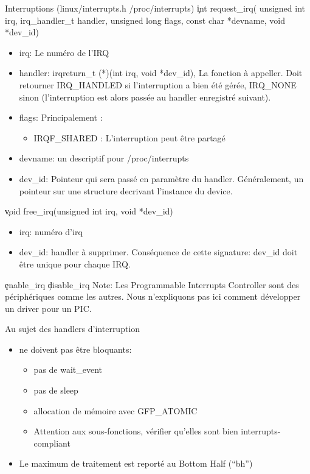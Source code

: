 \begin{frame}{Interruptions}
  (linux/interrupts.h /proc/interrupts)
  \c{int request_irq( unsigned int irq, irq_handler_t handler, unsigned long flags, const char *devname, void *dev_id)}
  \begin{itemize} 
  \item irq: Le numéro de l'IRQ
  \item handler: irqreturn_t (*)(int irq, void *dev_id), La fonction à appeller. Doit retourner IRQ_HANDLED si l'interruption a bien été gérée, IRQ_NONE sinon (l'interruption est alors passée au handler enregistré suivant).
  \item flags: Principalement : 
    \begin{itemize} 
    \item IRQF_SHARED : L'interruption peut être partagé
    \end{itemize} 
  \item devname: un descriptif pour /proc/interrupts
  \item dev_id: Pointeur qui sera passé en paramètre du handler. Généralement, un pointeur sur une structure decrivant l'instance du device.
  \end{itemize} 
  \c{void free_irq(unsigned int irq, void *dev_id)}
  \begin{itemize} 
  \item irq: numéro d'irq
  \item dev_id: handler à supprimer. Conséquence de cette signature: dev_id doit être unique pour chaque IRQ.
  \end{itemize} 
  \c{enable_irq}
  \c{disable_irq}
Note: Les Programmable Interrupts Controller sont des périphériques comme les autres. Nous n'expliquons pas ici comment développer un driver pour un PIC.
\end{frame}


\begin{frame}{Au sujet des handlers d'interruption}
  \begin{itemize} 
  \item ne doivent pas être bloquants: 
    \begin{itemize} 
    \item pas de wait_event
    \item pas de sleep
    \item allocation de mémoire avec GFP_ATOMIC 
    \item Attention aux sous-fonctions, vérifier qu'elles sont bien interrupts-compliant
    \end{itemize}
  \item Le maximum de traitement est reporté au Bottom Half (``bh'')
  \end{itemize}  
\end{frame} 

